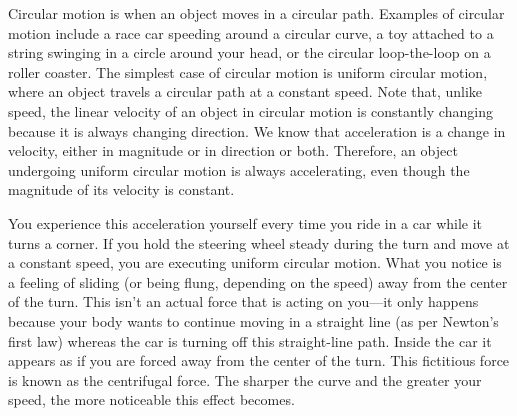 \documentclass[main-physics.tex]{subfiles}
\begin{document}
Circular motion is when an object moves in a circular path. Examples of circular motion include a race car speeding around a circular curve, a toy attached to a string swinging in a circle around your head, or the circular loop-the-loop on a roller coaster. The simplest case of circular motion is \gls{uniform circular motion}, where an object travels a circular path at a constant speed. Note that, unlike speed, the linear velocity of an object in circular motion is constantly changing because it is always changing direction. We know that acceleration is a change in velocity, either in magnitude or in direction or both. Therefore, an object undergoing uniform circular motion is always accelerating, even though the magnitude of its velocity is constant.

\vspace{1em}

You experience this acceleration yourself every time you ride in a car while it turns a corner. If you hold the steering wheel steady during the turn and move at a constant speed, you are executing uniform circular motion. What you notice is a feeling of sliding (or being flung, depending on the speed) away from the center of the turn. This isn't an actual force that is acting on you---it only happens because your body wants to continue moving in a straight line (as per Newton's first law) whereas the car is turning off this straight-line path. Inside the car it appears as if you are forced away from the center of the turn. This fictitious force is known as the \gls{centrifugal force}. The sharper the curve and the greater your speed, the more noticeable this effect becomes.

\begin{center}
\captionsetup{type=figure,margin=1in,font=scriptsize}
\label{4QmpMJ}
\end{center}
\end{document}
